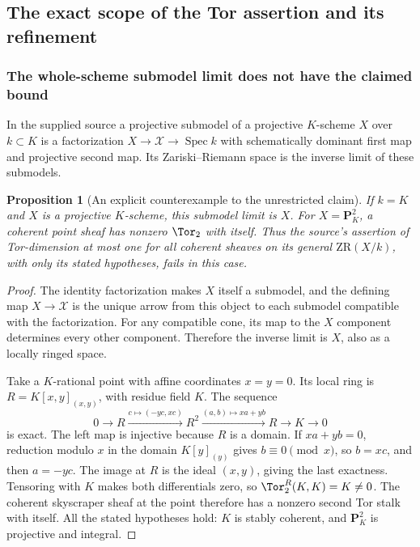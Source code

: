 \documentclass[11pt,a4paper]{article}
\newtheorem{proposition}[theorem]{Proposition}
\theoremstyle{definition}\newtheorem{definition}[theorem]{Definition}
\newcommand{\Spec}{\operatorname{Spec}}\newcommand{\SpecMon}{\operatorname{Spec}_{\mathrm{mon}}}
\begin{document}
\subsection{The exact scope of the Tor assertion and its refinement}
\label{sec:repair}

\subsubsection{The whole-scheme submodel limit does not have the claimed bound}

In the supplied source a projective submodel of a projective $K$-scheme
$X$ over $k\subset K$ is a factorization $X\to\mathcal X\to\Spec k$
with schematically dominant first map and projective second map.
Its Zariski--Riemann space is the inverse limit of these submodels.

\begin{proposition}[An explicit counterexample to the unrestricted claim]
\label{prop:source-counterexample}
If $k=K$ and $X$ is a projective $K$-scheme, this submodel limit is $X$.
For $X=\mathbf P^2_K$, a coherent point sheaf has nonzero $\Tor_2$ with
itself. Thus the source's assertion of Tor-dimension at most one for
all coherent sheaves on its general $\mathrm{ZR}(X/k)$, with only its
stated hypotheses, fails in this case.
\end{proposition}
\begin{proof}
The identity factorization makes $X$ itself a submodel, and the defining
map $X\to\mathcal X$ is the unique arrow from this object to each
submodel compatible with the factorization. For any compatible cone,
its map to the $X$ component determines every other component.
Therefore the inverse limit is $X$, also as a locally ringed space.

Take a $K$-rational point with affine coordinates $x=y=0$. Its local ring
is $R=K[x,y]_{(x,y)}$, with residue field $K$. The sequence
\[
 0\longrightarrow R\xrightarrow{c\mapsto(-yc,xc)}R^2
 \xrightarrow{(a,b)\mapsto xa+yb}R\longrightarrow K\longrightarrow0
 \tag{AV7.1}\label{eq:koszul}
\]
is exact. The left map is injective because $R$ is a domain. If
$xa+yb=0$, reduction modulo $x$ in the domain $K[y]_{(y)}$ gives
$b\equiv0\pmod x$, so $b=xc$, and then $a=-yc$. The image at $R$ is
the ideal $(x,y)$, giving the last exactness. Tensoring with $K$ makes
both differentials zero, so $\Tor_2^R(K,K)=K\ne0$.
The coherent skyscraper sheaf at the point therefore has a nonzero
second Tor stalk with itself. All the stated hypotheses hold: $K$ is
stably coherent, and $\mathbf P^2_K$ is projective and integral.
\end{proof}
\end{document}
